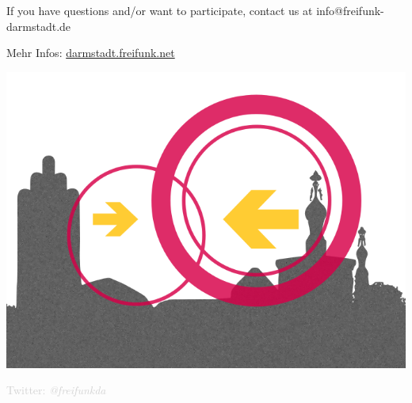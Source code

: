 \documentclass[a4paper]{article}
\begin{document}
\vspace{1.3cm}
\begin{Row}
    \begin{Cell}{1}
	If you have questions and/or want to participate, contact us at info@freifunk-darmstadt.de
	\end{Cell}
\end{Row}
\vspace{0.5cm}
\begin{center}
	\large Mehr Infos: \url{darmstadt.freifunk.net}
\end{center}
\begin{center}
\vspace{-0.5cm}
\hspace*{-0.05 \paperwidth}\includegraphics[width=\paperwidth]{DA-logo_trans}

\vspace{-2.7cm}
\large \textcolor{lightgrey}{Twitter: \textit{@freifunkda}}
\end{center}
\end{document}
